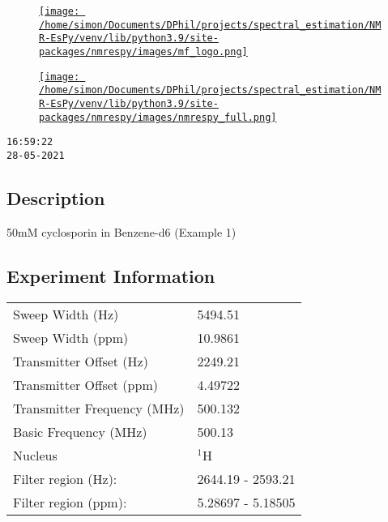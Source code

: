 \documentclass[8pt]{article}
\begin{document}
\begin{figure}[!ht]
\begin{minipage}[b][2.5cm][c]{.72\textwidth}
\href{http://foroozandeh.chem.ox.ac.uk/home}%
{\texttt{[image: /home/simon/Documents/DPhil/projects/spectral\_estimation/NMR-EsPy/venv/lib/python3.9/site-packages/nmrespy/images/mf\_logo.png]}}
\end{minipage}
\begin{minipage}[b][2.5cm][c]{.27\textwidth}
\href{https://nmr-espy.readthedocs.io/en/1.0.0rc1/}%
{\texttt{[image: /home/simon/Documents/DPhil/projects/spectral\_estimation/NMR-EsPy/venv/lib/python3.9/site-packages/nmrespy/images/nmrespy\_full.png]}}
\end{minipage}
\end{figure}

\texttt{16:59:22\\28-05-2021}

\subsection*{Description}
50mM cyclosporin in Benzene-d6 (Example 1)

\subsection*{Experiment Information}
\hspace{-6pt}
\begin{tabular}{ll}
Sweep Width (Hz) & 5494.51 \\
Sweep Width (ppm) & 10.9861 \\
Transmitter Offset (Hz) & 2249.21 \\
Transmitter Offset (ppm) & 4.49722 \\
Transmitter Frequency (MHz) & 500.132 \\
Basic Frequency (MHz) & 500.13 \\
Nucleus & $^{1}$H \\
Filter region (Hz): & 2644.19 - 2593.21 \\
Filter region (ppm): & 5.28697 - 5.18505 \\

\end{tabular}
\end{document}
